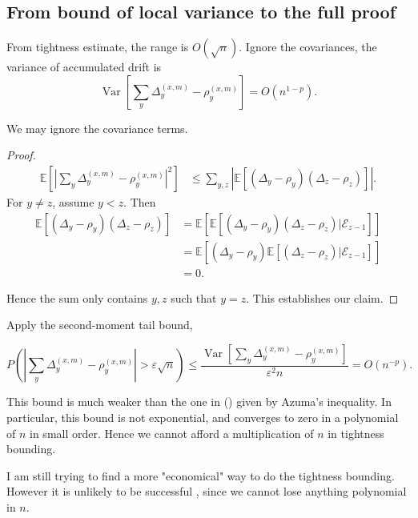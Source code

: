 
\subsection{From bound of local variance to the full proof}

From tightness estimate, the range is $O(\sqrt{n})$. Ignore the covariances, the variance of accumulated drift is
 \[
	 \operatorname{Var} \left[ \sum_y \Delta_y^{(x,m)} - \rho_y^{(x,m)} \right]  = O(n^{1 - p})
.\] 

\begin{lemma}
	We may ignore the covariance terms.
\end{lemma}
\begin{proof}
	\begin{align*}
		\mathbb{E}\left[ \left| \sum_y \Delta_y^{(x,m)} - \rho_y^{(x,m)} \right|^2 \right] 
		&\le \sum_{y, z} 
		\left|  \mathbb{E}\left[ \left( \Delta_y - \rho_y \right) (\Delta_z - \rho_z) \right]  \right|
	.\end{align*}
	For $y \neq z$, assume $y < z$. Then
	\begin{align*}
		\mathbb{E}\left[ \left( \Delta_y - \rho_y \right) (\Delta_z - \rho_z) \right]
		&= \mathbb{E}\left[ \mathbb{E} \left[ \left( \Delta_y - \rho_y \right) (\Delta_z - \rho_z) | \mathcal{E}_{z-1}\right] \right]\\
		&= \mathbb{E}\left[ \left( \Delta_y - \rho_y \right) \mathbb{E} \left[  (\Delta_z - \rho_z) | \mathcal{E}_{z-1}\right] \right]\\
		&= 0
	.\end{align*}

	Hence the sum only contains $y, z$ such that  $y = z$. This establishes our claim.
\end{proof}

Apply the second-moment tail bound,

\[
	P\left( \left| \sum_{y} \Delta_y^{(x,m)} - \rho_y^{(x,m)} \right| > \varepsilon\sqrt{n}  \right)
	\le  \frac{\operatorname{Var} \left[ \sum_{y} \Delta_y^{(x,m)} - \rho_y^{(x,m)}\right] }{\varepsilon^2 n}
	= O( n^{-p})
.\] 

This bound is much weaker than the one in (\cite{kosyginaFunctionalLimitLaws2016}) given by Azuma's inequality. In particular, this bound is not exponential, and converges to zero in a polynomial of $n$ in small order. Hence we cannot afford a multiplication of $n$ in tightness bounding.

I am still trying to find a more "economical" way to do the tightness bounding. However it is unlikely to be successful , since we cannot lose anything polynomial in $n$.

